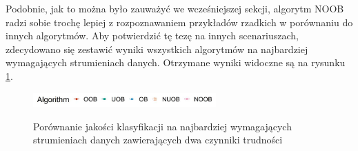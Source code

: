 \noindent Podobnie, jak to można było zauważyć we wcześniejszej sekcji, algorytm NOOB radzi sobie trochę lepiej z rozpoznawaniem przykładów rzadkich w porównaniu do innych algorytmów. Aby potwierdzić tę tezę na innych scenariuszach, zdecydowano się zestawić wyniki wszystkich algorytmów na najbardziej wymagających strumieniach danych. Otrzymane wyniki widoczne są na rysunku \ref{Figure:PairsComparison}.

\begin{figure}[h]
    \centering
    \includegraphics[width=7cm]{figures/algorithms_legend.JPG}
\end{figure}

\vspace{-1.2cm}

\begin{figure}[h]
    \centering
    \qquad
    \caption{Porównanie jakości klasyfikacji na najbardziej wymagających strumieniach danych zawierających dwa czynniki trudności}\label{Figure:PairsComparison}
\end{figure}


